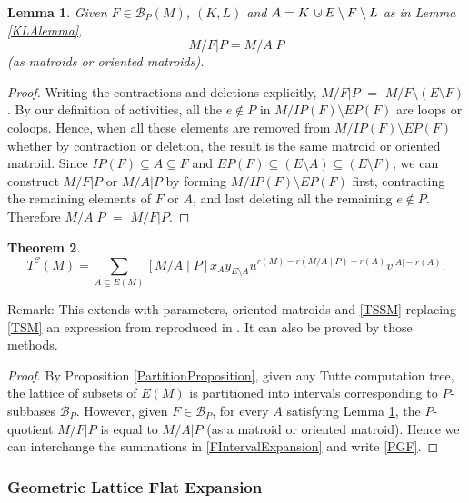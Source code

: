 \documentclass[12pt,leqno]{amsart}
\newtheorem{lem}{Lemma}
\newtheorem{thm}[lem]{Theorem}
\theoremstyle{remark}
\newcommand{\dunion}
{\mbox{\hbox{\hskip6pt$\cdot$\hskip-5.50pt$\cup$\hskip2pt}}}
\begin{document}
\begin{lem}
\label{FAMinorlemma}
Given $F\in\mathcal{B}_P(M)$, $(K,L)$ and $A=K\dunion E\setminus F\setminus L$
as in Lemma \ref{KLAlemma},
\[ M/F|P = M/A|P\]
(as matroids or oriented matroids).
\end{lem}
\begin{proof}
Writing the contractions and deletions explicitly, $M/F|P$ 
$=$ $M/F\setminus (E\setminus F)$.  By our definition of
activities, all the $e\not\in P$ in $M/IP(F)\setminus EP(F)$ are 
loops or coloops.  Hence, when all these elements are removed
from $M/IP(F)\setminus EP(F)$ whether by contraction or deletion, the
result is the same matroid or oriented matroid.  Since
$IP(F)\subseteq A\subseteq F$ and 
$EP(F)\subseteq (E\setminus A)\subseteq (E\setminus F)$, we 
can construct $M/F|P$ or $M/A|P$ by forming $M/IP(F)\setminus EP(F)$
first, contracting the remaining elements of $F$ or $A$,
and last deleting all the remaining $e\not\in P$.  
Therefore  $M/A|P$ $=$ $M/F|P$.
\end{proof}

\begin{thm}
\begin{equation}
\tag{PGF}
\label{PGF}
T^{\mathcal{C}}(M) = \sum_{A\subseteq E(M)}[M/A \mid P]x_A y_{E\setminus A}
u^{r(M)-r(M/A\mid P)-r(A)}
v^{|A|-r(A)}.
\end{equation}
\end{thm}

Remark: This extends with parameters, oriented matroids and 
\eqref{TSSM} replacing \eqref{TSM} an expression from
\cite{MR0419272} reproduced in \cite{sdcPorted}.  It can
also be proved by those methods.

\begin{proof}
By Proposition \ref{PartitionProposition}, given any Tutte computation tree,
the lattice of subsets of $E(M)$ is partitioned
into intervals corresponding to $P$-subbases $\mathcal{B}_P$.  
However,  given $F\in\mathcal{B}_P$, for every $A$ satisfying
Lemma \ref{FAMinorlemma}, the $P$-quotient $M/F|P$ is equal to 
$M/A|P$ (as a matroid or oriented matroid).  Hence we can 
interchange the summations in \eqref{FIntervalExpansion} and write
\eqref{PGF}.
\end{proof}

\subsubsection{Geometric Lattice Flat Expansion}
\end{document}
